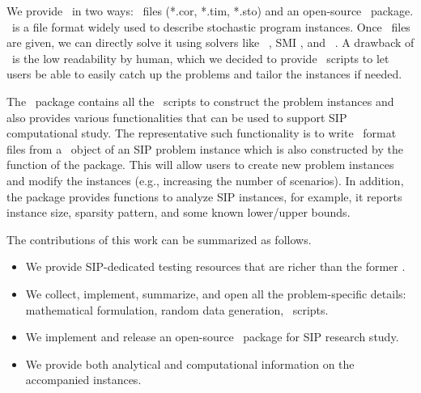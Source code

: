 We provide \siplibtwo\ in two ways: \smps\ files (*.cor, *.tim, *.sto) \cite{smps} and an open-source \julia\ package. \smps\ is a file format widely used to describe stochastic program 
instances. Once \smps\ files are given, we can directly solve it using solvers like \dsp\ 
\cite{web:DSP}, \textsf{SMI} \cite{web:SMI}, and \scip\ \cite{SCIP}. A drawback of \smps\ is the low 
readability by human, which we decided to provide \julia\ scripts to let users be able to 
easily catch up the problems and tailor the instances if needed. 

The \julia\ package contains all the \julia\ scripts to construct the problem instances and also provides various functionalities that can be used to support SIP computational study. The representative such functionality is to write \smps\ format files from a \julia\ object of an SIP problem instance which is also constructed by the function of the package. This will allow users to create new problem instances and modify the instances (e.g., increasing the number of scenarios). In addition, the package provides functions to analyze SIP instances, for example, it reports instance size, sparsity pattern, and some known lower/upper bounds.

The contributions of this work can be summarized as follows.
\begin{itemize}
	\item We provide SIP-dedicated testing resources that are richer than the former \siplib.
	\item We collect, implement, summarize, and open all the problem-specific details: 
	mathematical formulation, random data generation, \julia\ scripts.
	\item We implement and release an open-source \julia\ package for SIP research study.
	\item We provide both analytical and computational information on the accompanied 
	instances.
\end{itemize}

